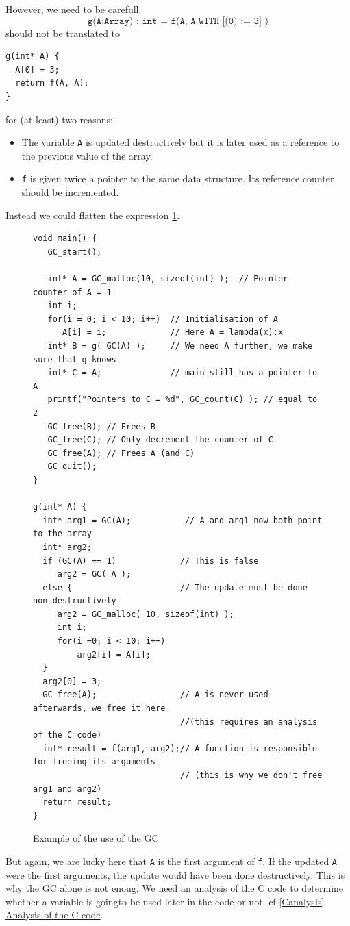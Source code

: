 \documentclass[12pt,a4paper,titlepage]{article}
\newcommand{\cl}[1]{\texttt{#1}}
\begin{document}
However, we need to be carefull.
$$ \cl{g(A:Array) : int = f(A, A WITH [(0) := 3] )}$$
should not be translated to
\begin{lstlisting}
g(int* A) {
  A[0] = 3;
  return f(A, A);
}
\end{lstlisting}
for (at least) two reasons:
\begin{itemize}
\item The variable \cl{A} is updated destructively but it is later used as a reference to the previous value of the array.
\item \cl{f} is given twice a pointer to the same data structure. Its reference counter should be incremented.
\end{itemize}

Instead we could flatten the expression \ref{fig:exampleGC}.

\begin{figure}[!ht]
\begin{lstlisting}
void main() {
   GC_start();
   
   int* A = GC_malloc(10, sizeof(int) );  // Pointer counter of A = 1
   int i;
   for(i = 0; i < 10; i++)  // Initialisation of A
      A[i] = i;             // Here A = lambda(x):x
   int* B = g( GC(A) );     // We need A further, we make sure that g knows
   int* C = A;              // main still has a pointer to A
   printf("Pointers to C = %d", GC_count(C) ); // equal to 2
   GC_free(B); // Frees B
   GC_free(C); // Only decrement the counter of C
   GC_free(A); // Frees A (and C)
   GC_quit();
}

g(int* A) {
  int* arg1 = GC(A);           // A and arg1 now both point to the array
  int* arg2;
  if (GC(A) == 1)             // This is false
     arg2 = GC( A );
  else {                      // The update must be done non destructively
     arg2 = GC_malloc( 10, sizeof(int) );
     int i;
     for(i =0; i < 10; i++)
         arg2[i] = A[i];
  }  
  arg2[0] = 3;
  GC_free(A);                 // A is never used afterwards, we free it here
                              //(this requires an analysis of the C code)
  int* result = f(arg1, arg2);// A function is responsible for freeing its arguments
                              // (this is why we don't free arg1 and arg2)
  return result;
}
\end{lstlisting}
\caption{Example of the use of the GC}
\label{fig:exampleGC}
\end{figure}


But again, we are lucky here that \cl{A} is the first argument of \cl{f}. If the updated \cl{A} were the first arguments, the update would have been done destructively.
This is why the GC alone is not enoug. We need an analysis of the C code to determine whether a variable is goingto be used later in the code or not. cf \hyperref[Canalysis]{\ref*{Canalysis} Analysis of the C code}.
\end{document}
